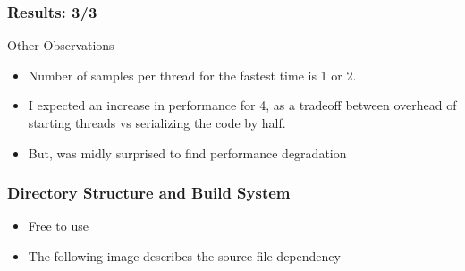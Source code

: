 \documentclass[mathserif]{beamer}
\begin{document}
\begin{frame}                                                                                                                                                                          
\frametitle{Results: 3/3}
\begin{block}{Other Observations}
\begin{itemize}
\item Number of samples per thread for the fastest time is 1 or 2.  
\item I expected an increase in performance for 4, as a tradeoff between overhead of starting threads vs serializing the code by half.  
\item But, was midly surprised to find performance degradation 
\end{itemize}
\end{block}
\end{frame}             

\begin{frame}                                                                                                                                                                          
\frametitle{Directory Structure and Build System}
\begin{center}
\begin{itemize}
\item Free to use
\item The following image describes the source file dependency 
\end{itemize}
\end{center}
\end{frame}             
\end{document}
